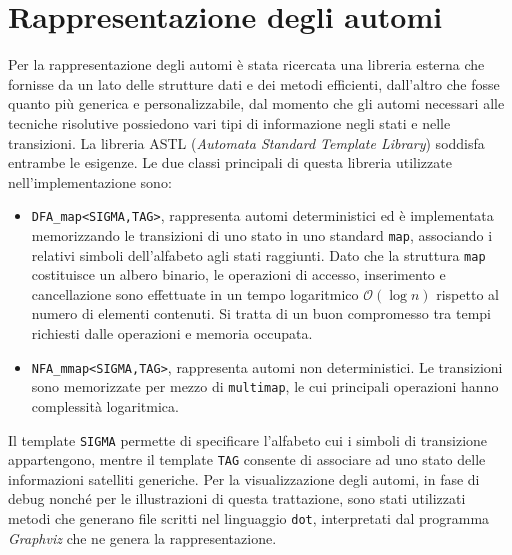 \section{Rappresentazione degli automi}
Per la rappresentazione degli automi è stata ricercata una libreria esterna che fornisse da un lato delle strutture dati e dei metodi efficienti, dall'altro che fosse quanto più generica e personalizzabile, dal momento che gli automi necessari alle tecniche risolutive possiedono vari tipi di informazione negli stati e nelle transizioni. La libreria ASTL (\emph{Automata Standard Template Library}) \cite{web:astl} soddisfa entrambe le esigenze. Le due classi principali di questa libreria utilizzate nell'implementazione sono:
\begin{itemize}
\item \verb|DFA_map<SIGMA,TAG>|, rappresenta automi deterministici ed è implementata memorizzando le transizioni di uno stato in uno standard \verb|map|, associando i relativi simboli dell'alfabeto agli stati raggiunti. Dato che la struttura \verb|map| costituisce un albero binario, le operazioni di accesso, inserimento e cancellazione sono effettuate in un tempo logaritmico $\mathcal{O}(\log n)$ rispetto al numero di elementi contenuti.  Si tratta di un buon compromesso tra tempi richiesti dalle operazioni e memoria occupata.
\item \verb|NFA_mmap<SIGMA,TAG>|, rappresenta automi non deterministici. Le transizioni sono memorizzate per mezzo di \verb|multimap|, le cui principali operazioni hanno complessità logaritmica.
\end{itemize}
Il template \verb|SIGMA| permette di specificare l'alfabeto cui i simboli di transizione appartengono, mentre il template \verb|TAG| consente di associare ad uno stato delle informazioni satelliti generiche. 
Per la visualizzazione degli automi, in fase di debug nonché per le illustrazioni di questa trattazione, sono stati utilizzati metodi che generano file scritti nel linguaggio \verb|dot|, interpretati dal programma \emph{Graphviz}\cite{web:graphviz} che ne genera la rappresentazione.

